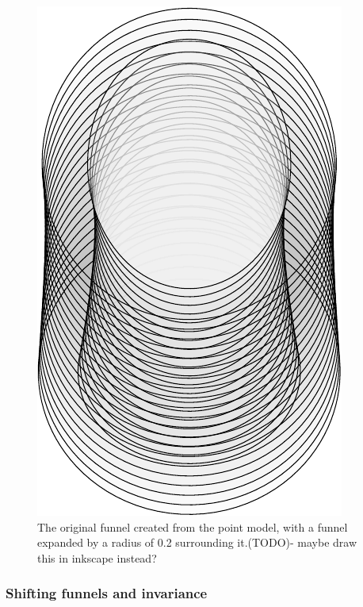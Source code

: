 \begin{figure}
\centering
\includegraphics[clip, trim=6cm 8cm 6cm 8cm, scale=.5]{figures/method/expanded-funnel}
\caption{The original funnel created from the point model, with a funnel
  expanded by a radius of 0.2 surrounding it.(TODO)- maybe draw this in inkscape
instead?}
\label{fig:expanded-funnel}
\end{figure}

\subsubsection{Shifting funnels and invariance}

